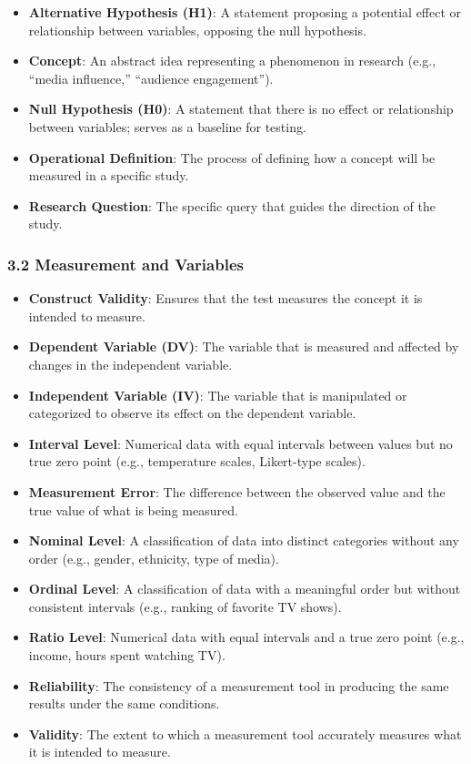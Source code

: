 \documentclass[
]{book}
\providecommand{\tightlist}{%
  \setlength{\itemsep}{0pt}\setlength{\parskip}{0pt}}
\begin{document}
\begin{itemize}
\tightlist
\item
  \textbf{Alternative Hypothesis (H1)}: A statement proposing a potential effect or relationship between variables, opposing the null hypothesis.
\item
  \textbf{Concept}: An abstract idea representing a phenomenon in research (e.g., ``media influence,'' ``audience engagement'').
\item
  \textbf{Null Hypothesis (H0)}: A statement that there is no effect or relationship between variables; serves as a baseline for testing.
\item
  \textbf{Operational Definition}: The process of defining how a concept will be measured in a specific study.
\item
  \textbf{Research Question}: The specific query that guides the direction of the study.
\end{itemize}

\subsubsection*{\texorpdfstring{\textbf{3.2 Measurement and Variables}}{3.2 Measurement and Variables}}\label{measurement-and-variables}

\begin{itemize}
\tightlist
\item
  \textbf{Construct Validity}: Ensures that the test measures the concept it is intended to measure.
\item
  \textbf{Dependent Variable (DV)}: The variable that is measured and affected by changes in the independent variable.
\item
  \textbf{Independent Variable (IV)}: The variable that is manipulated or categorized to observe its effect on the dependent variable.
\item
  \textbf{Interval Level}: Numerical data with equal intervals between values but no true zero point (e.g., temperature scales, Likert-type scales).
\item
  \textbf{Measurement Error}: The difference between the observed value and the true value of what is being measured.
\item
  \textbf{Nominal Level}: A classification of data into distinct categories without any order (e.g., gender, ethnicity, type of media).
\item
  \textbf{Ordinal Level}: A classification of data with a meaningful order but without consistent intervals (e.g., ranking of favorite TV shows).
\item
  \textbf{Ratio Level}: Numerical data with equal intervals and a true zero point (e.g., income, hours spent watching TV).
\item
  \textbf{Reliability}: The consistency of a measurement tool in producing the same results under the same conditions.
\item
  \textbf{Validity}: The extent to which a measurement tool accurately measures what it is intended to measure.
\end{itemize}
\end{document}
